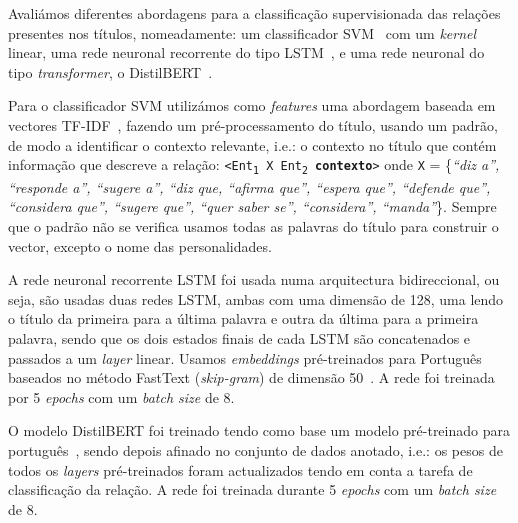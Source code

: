 \documentclass[a4paper, twocolumn, 11pt, twoside]{article}
\begin{document}
Avaliámos diferentes abordagens para a classificação supervisionada das relações presentes nos títulos, nomeadamente: um classificador SVM~\citep{cortes1995support} com um \textit{kernel} linear, uma rede neuronal recorrente do tipo LSTM~\citep{10.1162/neco.1997.9.8.1735}, e uma rede neuronal do tipo \textit{transformer}, o DistilBERT~\citep{9463516}.

Para o classificador SVM utilizámos como \textit{features} uma abordagem baseada em vectores TF-IDF~\citep{DBLP:journals/ipm/SaltonB88}, fazendo um pré-processamento do título, usando um padrão, de modo a identificar o contexto relevante, i.e.: o contexto no título que contém informação que descreve a relação: \texttt{<Ent\textsubscript{1} X Ent\textsubscript{2} \textbf{contexto}>} onde \texttt{X} = \{\textit{“diz a”, “responde a”, “sugere a”, “diz que, “afirma que”, “espera que”, “defende que”, “considera que”, “sugere que”, “quer saber se”, “considera”, “manda”}\}. Sempre que o padrão não se verifica usamos todas as palavras do título para construir o vector, excepto o nome das personalidades.

A rede neuronal recorrente LSTM foi usada numa arquitectura bidireccional, ou seja, são usadas duas redes LSTM, ambas com uma dimensão de 128, uma lendo o título da primeira para a última palavra e outra da última para a primeira palavra, sendo que os dois estados finais de cada LSTM são concatenados e passados a um \textit{layer} linear. Usamos \textit{embeddings} pré-treinados para Português baseados no método FastText (\textit{skip-gram}) de dimensão 50~\citep{hartmann-etal-2017-portuguese}. A rede foi treinada por 5 \textit{epochs} com um \textit{batch size} de 8.

O modelo DistilBERT foi treinado tendo como base um modelo pré-treinado para português~\citep{abdaoui-etal-2020-load}, sendo depois afinado no conjunto de dados anotado, i.e.: os pesos de todos os \textit{layers} pré-treinados foram actualizados tendo em conta a tarefa de classificação da relação. A rede foi treinada durante 5 \textit{epochs} com um \textit{batch size} de 8.
\end{document}
